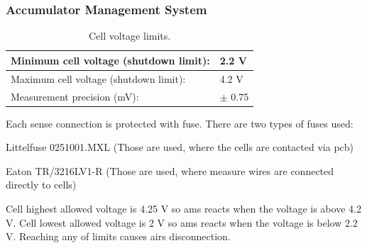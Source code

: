 \subsubsection{Accumulator Management System}


\begin{table}[H]
	\centering
	\caption{Cell voltage limits.}
	\begin{tabularx}{\textwidth}{|X|X|}
		\hline
		Minimum cell voltage (shutdown limit): & 2.2 V \\[\TableSize]
		\hline
		Maximum cell voltage (shutdown limit): & 4.2 V \\[\TableSize]
		\hline
		Measurement precision (mV): & $\pm$ 0.75 \\[\TableSize]
		\hline
	\end{tabularx}%
	\label{tab:acc-limits}%
\end{table}%


Each sense connection is protected with fuse. There are two types of fuses used: 

\noindent Littelfuse 0251001.MXL (Those are used, where the cells are contacted via \gls{pcb})

\noindent Eaton TR/3216LV1-R (Those are used, where measure wires are connected directly to cells)

Cell highest allowed voltage is 4.25 V so \gls{ams} reacts when the voltage is above 4.2 V. Cell lowest allowed voltage is 2 V so \gls{ams} reacts when the voltage is below 2.2 V. Reaching any of limits causes \glspl{air} disconnection.

